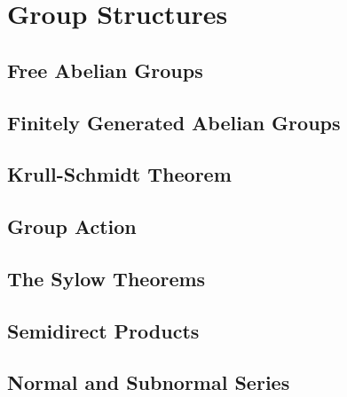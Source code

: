 \documentclass[a4paper,sfsidenotes,openany]{tufte-book}
\theoremstyle{theorem}
\begin{document}
\newpage

\chapter{Group Structures}
\begin{fullwidth}
\section{Free Abelian Groups}

\section{Finitely Generated Abelian Groups}

\section{Krull-Schmidt Theorem}

\section{Group Action}

\section{The Sylow Theorems}

\section{Semidirect Products}

\section{Normal and Subnormal Series}

\end{fullwidth}

\newpage

\end{document}
